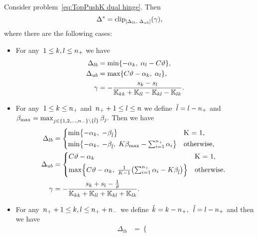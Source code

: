 \begin{theorem}\label{thm:Update rule TopPushK with hinge loss}
  Consider problem~\eqref{eq:TopPushK dual hinge}. Then
  \begin{equation*}
    \Delta^{*} = \clip{\Delta_{lb}}{\Delta_{ub}}{\gamma},
  \end{equation*}
  where there are the following cases:
  \begin{itemize}
    \item For any~$1\le k, l \le n_{+}$ we have
    \begin{align*}
      \Delta_{lb} & = \min\{- \alpha_k,\; \alpha_l - C \vartheta \}, \\
      \Delta_{ub} & = \max\{C \vartheta - \alpha_k,\; \alpha_l \}, \\
      \gamma      & = -\frac{s_k - s_l}{\mathbb{K}_{kk} + \mathbb{K}_{ll} - \mathbb{K}_{kl} - \mathbb{K}_{lk}}.
    \end{align*}
    \item For any~$1 \le k \le n_{+}$ and~$n_{+} + 1 \le l \le n$ we define~$\hat{l} = l - n_{+}$ and~$\beta_{\max} = \max_{j \in \{1, 2, \ldots, n_{-} \} \setminus \{\hat l\}} \beta_j.$ Then we have
    \begin{align*}
      \Delta_{lb} & = 
        \begin{cases*}
          \min \Brac[c]{- \alpha_k,\;  -\beta_{\hat{l}}} & K = 1, \\
          \min \Brac[c]{- \alpha_k,\;  -\beta_{\hat{l}}, \; K\beta_{\max} - \sum_{i = 1}^{\npos} \alpha_i} & \textrm{otherwise},
        \end{cases*} \\
      \Delta_{ub} & = 
        \begin{cases*}
            C \vartheta - \alpha_k & K = 1, \\
            \max \Brac[c]{C \vartheta - \alpha_k, \; \frac{1}{K-1}\Brac{\sum_{i = 1}^{\npos} \alpha_i - K \beta_{\hat{l}}}}  & \textrm{otherwise}.
        \end{cases*} \\
      \gamma & = - \frac{s_k + s_l - \frac{1}{\vartheta}}{\K_{kk} + \K_{ll} + \K_{kl} + \K_{lk}}.
    \end{align*}
    \item For any~$n_{+} + 1\le k,l \le n_{+} + n_{-}$ we define~$\hat{k} = k - n_{+},$~$\hat{l} = l - n_{+}$ and then we have
    \begin{align*}
      \Delta_{lb} & = 
        \begin{cases*}

\end{cases*}
\end{align*}
\end{itemize}
\end{theorem}
